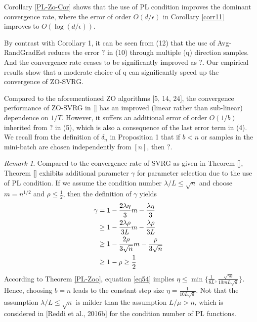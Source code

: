 \documentclass{article}
\theoremstyle{definition}
\theoremstyle{remark}
\newtheorem{remark}[theorem]{Remark}
\begin{document}
Corollary \ref{PL-Zo-Cor} shows that the use of PL condition improves the dominant convergence rate, where the error of
order $O(d/\epsilon)$ in Corollary \ref{corr11} improves to $O(\log(d/\epsilon))$.
{\color{Brown}
By contrast with Corollary 1, it can be seen from (12) that the use of Avg-RandGradEst reduces the
error $?$ in (10) through multiple (q) direction samples. And the convergence rate ceases to
be significantly improved as $?$. Our empirical results show that a moderate choice of q can
significantly speed up the convergence of ZO-SVRG.

Compared to the aforementioned ZO algorithms [5, 14, 24], the convergence performance of ZO-SVRG in \eqref{} has an improved (linear rather than sub-linear) dependence on $1/T$. However, it suffers an additional error of order $O(1/b)$ inherited
from $?$ in (5), which is also a consequence of the last error term in (4). We recall from the
definition of $\delta_n$ in Proposition 1 that if $b < n$ or samples in the mini-batch are chosen independently
from $[n]$, then $?$.
}
\begin{remark}
Compared to the convergence rate of SVRG as given in Theorem \ref{}, Theorem \ref{} exhibits additional parameter $\gamma$ for parameter selection due to the use of PL condition. 
If we assume the condition number $\lambda/L\leq \sqrt{n}$ and choose $m = n^{1/2}$ and $\rho\leq \frac{1}{2}$, then the definition of $\gamma$ yields  
\begin{align}
\gamma &= 1-\frac{2\lambda\eta}{3} m-\frac{\lambda\eta}{3}\notag \\
& \geq 1 - \frac{2\lambda\rho}{3L}m - \frac{\lambda\rho}{3L}\notag\\
& \geq  1 - \frac{2\rho}{3\sqrt{n}}m - \frac{\rho}{3\sqrt{n}}\notag\\
& \geq  1 - \rho \geq \frac{1}{2}\label{eq54}
\end{align}
According to Theorem \ref{PL-Zoo}, equation \eqref{eq54} implies $\eta \leq \min\{\frac{1}{8L}, \frac{\sqrt{\gamma b}}{10 m L \sqrt{d}}\}$. 
Hence, choosing $b = n$ leads to the constant step size  $\eta = \frac{1}{10 L \sqrt{d}}$.
Not that the assumption $\lambda/L \leq \sqrt{n}$ is milder than the assumption $L/\mu > n$, which is considered in [Reddi et al., 2016b] for the condition number of PL functions.
\end{remark}
\end{document}
